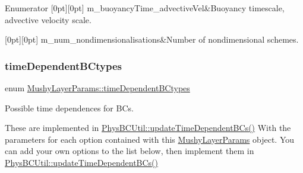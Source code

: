 \begin{DoxyEnumFields}{Enumerator}
[0pt][0pt]{}\mbox{\label{class_mushy_layer_params_a9de94ba9465c51de9b37fc946622bee8a53a77635db4cc741e10e7d2ddaaa3236}} 
m\+\_\+buoyancy\+Time\+\_\+advective\+Vel&Buoyancy timescale, advective velocity scale. \\
\hline

[0pt][0pt]{}\mbox{\label{class_mushy_layer_params_a9de94ba9465c51de9b37fc946622bee8ad984db365974fb0878c4a138d41c5ead}} 
m\+\_\+num\+\_\+nondimensionalisations&Number of nondimensional schemes. \\
\hline

\end{DoxyEnumFields}
\mbox{\label{class_mushy_layer_params_a029cd583b3d31671363f600177a885ac}} 
\subsubsection{\texorpdfstring{time\+Dependent\+B\+Ctypes}{timeDependentBCtypes}}
{\footnotesize\ttfamily enum \hyperlink{class_mushy_layer_params_a029cd583b3d31671363f600177a885ac}{Mushy\+Layer\+Params\+::time\+Dependent\+B\+Ctypes}}



Possible time dependences for B\+Cs. 

These are implemented in \hyperlink{class_phys_b_c_util_a0caf25dc5c31d42a6f41734c5d9feaff}{Phys\+B\+C\+Util\+::update\+Time\+Dependent\+B\+Cs()} With the parameters for each option contained with this \hyperlink{class_mushy_layer_params}{Mushy\+Layer\+Params} object. You can add your own options to the list below, then implement them in \hyperlink{class_phys_b_c_util_a0caf25dc5c31d42a6f41734c5d9feaff}{Phys\+B\+C\+Util\+::update\+Time\+Dependent\+B\+Cs()} 

